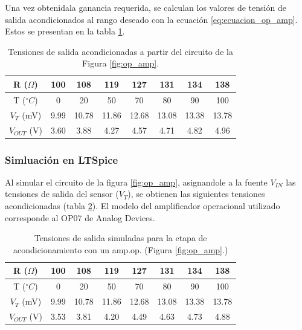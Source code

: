 \documentclass[journal,trans]{IEEEtran}
\begin{document}
Una vez obtenidala ganancia requerida, se calculan los valores de tensión de salida acondicionados al rango deseado con la ecuación \ref{eq:ecuacion_op_amp}. Estos se presentan en la tabla \ref{tab:tensiones_salida_acondicionados}.

\begin{table}[htb]
    \begin{center}
        \caption{Tensiones de salida acondicionadas a partir del circuito de la Figura \ref{fig:op_amp}.}
        \label{tab:tensiones_salida_acondicionados}
        \begin{tabular}{c | c | c | c | c | c | c | c}
            \hline
            R ($\Omega$) & 100 & 108 & 119 & 127 & 131 & 134 & 138 \\
            \hline
            T ($^{\circ}C$) & 0 & 20 & 50 & 70 & 80 & 90 & 100 \\
            \hline
            $V_{T}$ (mV) & 9.99 & 10.78 & 11.86 & 12.68 & 13.08 & 13.38 & 13.78 \\
            \hline
            $V_{OUT}$ (V) & 3.60 & 3.88 & 4.27 & 4.57 & 4.71 & 4.82 & 4.96 \\
            \hline
        \end{tabular}
    \end{center}
\end{table}

\subsubsection{Simluación en LTSpice}

Al simular el circuito de la figura \ref{fig:op_amp}, asignandole a la fuente $V_{IN}$ las tensiones de salida del sensor ($V_{T}$), se obtienen las siguientes tensiones acondicionadas (tabla \ref{tab:tensiones_salida_simuladas_op_amp}). El modelo del amplificador operacional utilizado corresponde al OP07 de Analog Devices.

\begin{table}[htb]
    \begin{center}
        \caption{Tensiones de salida simuladas para la etapa de acondicionamiento con un amp.op. (Figura \ref{fig:op_amp}.)}
        \label{tab:tensiones_salida_simuladas_op_amp}
        \begin{tabular}{c | c | c | c | c | c | c | c}
            \hline
            R ($\Omega$) & 100 & 108 & 119 & 127 & 131 & 134 & 138 \\
            \hline
            T ($^{\circ}C$) & 0 & 20 & 50 & 70 & 80 & 90 & 100 \\
            \hline
            $V_{T}$ (mV) & 9.99 & 10.78 & 11.86 & 12.68 & 13.08 & 13.38 & 13.78 \\
            \hline
            $V_{OUT}$ (V) & 3.53 & 3.81 & 4.20 & 4.49 & 4.63 & 4.73 & 4.88 \\
            \hline
        \end{tabular}
    \end{center}
\end{table}
\end{document}
